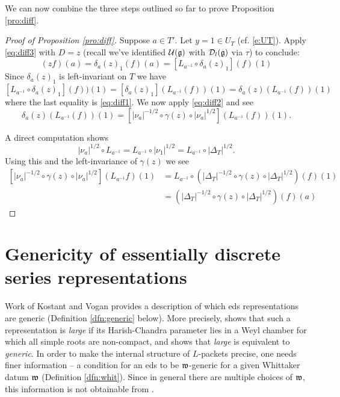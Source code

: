 \documentclass{article}
\theoremstyle{definition}
\numberwithin{equation}{section}
\renewcommand{\-}{\hyp{}}
\newcommand{\g}{\mathfrak g}
\begin{document}
We can now combine the three steps outlined so far to prove Proposition \ref{pro:diff}.
\begin{proof}[Proof of Proposition \ref{pro:diff}]
Suppose $a\in T'$. Let $y=1\in U_T$ (cf. \eqref{e:UT}). Apply \eqref{eq:diff3} with $D=z$ 
(recall we've identified $\mc{U}(\g)$ with $\mc{D}_l(\g)$ via $\tau$)
to conclude:
\[
 (zf)(a) = \delta_a(z)_1(f)(a) =[L_{a^{-1}}\circ\delta_a(z)_1](f)(1)
\]
Since $\delta_a(z)_1$ is left-invariant on $T$ we have
\[
[L_{a^{-1}}\circ\delta_a(z)_1](f))(1)=[\delta_a(z)_1](L_{a^{-1}}(f))(1)=\delta_a(z)(L_{a^{-1}}(f))(1)
\]
where the last equality is \eqref{eq:diff1}.
We now apply \eqref{eq:diff2} and see
\[ \delta_a(z)(L_{a^{-1}}(f))(1) = [|\nu_a|^{-1/2} \circ \gamma(z) \circ |\nu_a|^{1/2}](L_{a^{-1}}(f))(1). 
\]

A direct computation shows 
$$
|\nu_a|^{1/2} \circ L_{a^{-1}}=L_{a^{-1}} \circ |\nu_1|^{1/2}=L_{a^{-1}} \circ |\Delta_T|^{1/2}.
$$
Using this and the left-invariance of $\gamma(z)$ we see 
\[ 
\begin{aligned}
[|\nu_a|^{-1/2} \circ \gamma(z) \circ |\nu_a|^{1/2}](L_{a^{-1}}f)(1) &= L_{a^{-1}}\circ(|\Delta_T|^{-1/2} \circ \gamma(z) \circ |\Delta_T|^{1/2})(f)(1)\\
&=(|\Delta_T|^{-1/2} \circ \gamma(z) \circ |\Delta_T|^{1/2})(f)(a)
\end{aligned}
\]

\end{proof}

\section{Genericity of essentially discrete series representations} \label{sec:gen}

Work of Kostant \cite{Kos78} and Vogan \cite{Vog78} provides a description of which eds representations are generic (Definition \ref{dfn:generic} below). More precisely, \cite[Theorem 6.2(a,f)]{Vog78} shows that such a representation is \emph{large} if its Harish-Chandra parameter lies in a Weyl chamber for which all simple roots are non-compact, and \cite[Theorem L]{Kos78} shows that \emph{large} is equivalent to \emph{generic}. In order to make the internal structure of $L$-packets precise, one needs finer information -- a condition for an eds to be $\mathfrak{w}$-generic for a given Whittaker datum $\mathfrak{w}$ (Definition \ref{dfn:whit}). Since in general there are multiple choices of $\mathfrak{w}$, this information is not obtainable from \cite[Theorem 6.2(a,f)]{Vog78}.
 
\end{document}
